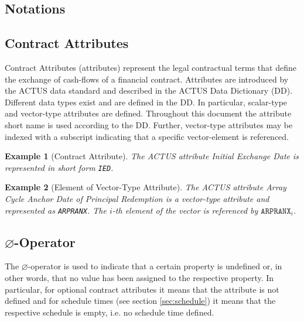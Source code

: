 \documentclass[9pt,oneside]{amsart}
\newtheorem{example}{Example}
\newcommand{\attr}[1]{\texttt{#1}}
\newcommand{\undef}{\varnothing}
\begin{document}
\setlength{\columnsep}{20pt}
\begin{multicols}{2}



\section{Notations}\label{sec:notations}

\subsection{Contract Attributes}\label{sec:attributes}

Contract Attributes (attributes) represent the legal contractual terms that define the exchange of cash-flows of a financial contract. Attributes are introduced by the ACTUS data standard and described in the ACTUS Data Dictionary (DD). Different data types exist and are defined in the DD. In particular, scalar-type and vector-type attributes are defined. Throughout this document the attribute short name is used according to the DD. Further, vector-type attributes may be indexed with a subscript indicating that a specific vector-element is referenced.

\begin{example}[Contract Attribute]
The ACTUS attribute \textit{Initial Exchange Date} is represented in short form \attr{IED}.
\end{example}


\begin{example}[Element of Vector-Type Attribute]
The ACTUS attribute \textit{Array Cycle Anchor Date of Principal Redemption} is a vector-type attribute and represented as \attr{ARPRANX}. The $i$-th element of the vector is referenced by $\attr{ARPRANX}_i$.
\end{example}


\subsection{$\undef$-Operator}\label{sec:undef}

The $\undef$-operator is used to indicate that a certain property is undefined or, in other words, that no value has been assigned to the respective property. In particular, for optional contract attributes it means that the attribute is not defined and for schedule times (see section \ref{sec:schedule}) it means that the respective schedule is empty, i.e. no schedule time defined.


\end{multicols}
\end{document}
